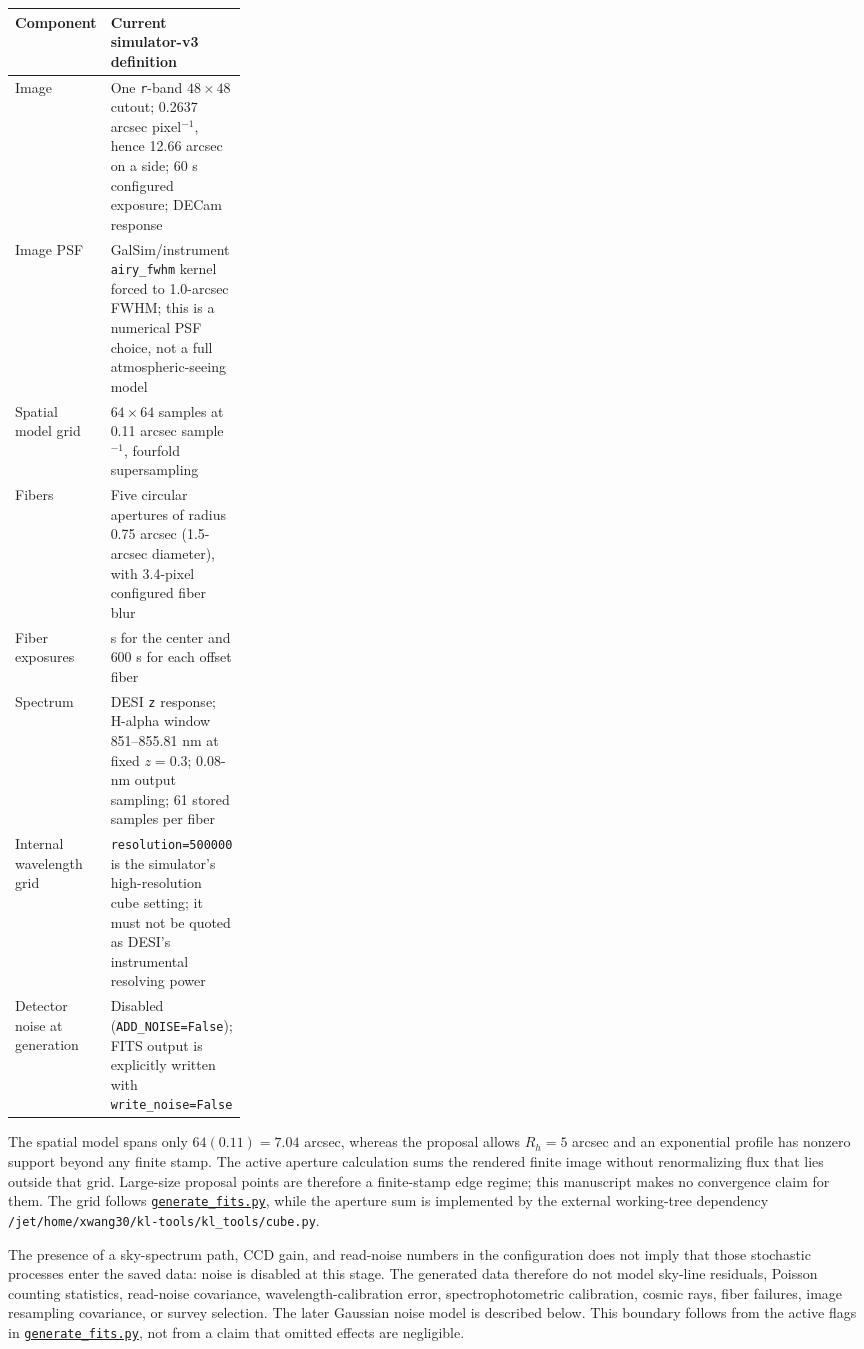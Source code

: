 \documentclass[11pt]{article}
\newcommand{\code}[1]{\nolinkurl{#1}}
\begin{document}
\begin{center}
\small
\begin{tabularx}{\linewidth}{@{}>{\RaggedRight\arraybackslash}p{0.27\linewidth} >{\RaggedRight\arraybackslash}X@{}}
\toprule
\textbf{Component} & \textbf{Current simulator-v3 definition} \\
\midrule
Image & One \code{r}-band \(48\times48\) cutout; 0.2637 arcsec pixel\(^{-1}\), hence 12.66 arcsec on a side; 60 s configured exposure; DECam response \\
Image PSF & GalSim/instrument \code{airy_fwhm} kernel forced to 1.0-arcsec FWHM; this is a numerical PSF choice, not a full atmospheric-seeing model \\
Spatial model grid & \(64\times64\) samples at 0.11 arcsec sample\(^{-1}\), fourfold supersampling \\
Fibers & Five circular apertures of radius 0.75 arcsec (1.5-arcsec diameter), with 3.4-pixel configured fiber blur \\
Fiber exposures & 180 s for the center and 600 s for each offset fiber \\
Spectrum & DESI \code{z} response; H-alpha window 851--855.81 nm at fixed \(z=0.3\); 0.08-nm output sampling; 61 stored samples per fiber \\
Internal wavelength grid & \code{resolution=500000} is the simulator's high-resolution cube setting; it must not be quoted as DESI's instrumental resolving power \\
Detector noise at generation & Disabled (\code{ADD_NOISE=False}); FITS output is explicitly written with \code{write_noise=False} \\
\bottomrule
\end{tabularx}
\end{center}

The spatial model spans only \(64(0.11)=7.04\) arcsec, whereas the proposal
allows \(R_h=5\) arcsec and an exponential profile has nonzero support
beyond any finite stamp. The active aperture calculation sums the rendered
finite image without renormalizing flux that lies outside that grid. Large-size
proposal points are therefore a finite-stamp edge regime; this manuscript makes
no convergence claim for them. The grid follows
\href{../data_generate/generate_fits.py}{\code{generate_fits.py}}, while the aperture
sum is implemented by the external working-tree dependency
\code{/jet/home/xwang30/kl-tools/kl_tools/cube.py}.

The presence of a sky-spectrum path, CCD gain, and read-noise numbers in the
configuration does not imply that those stochastic processes enter the saved
data: noise is disabled at this stage. The generated data therefore do not
model sky-line residuals, Poisson counting statistics, read-noise covariance,
wavelength-calibration error, spectrophotometric calibration, cosmic rays,
fiber failures, image resampling covariance, or survey selection. The later
Gaussian noise model is described below. This boundary follows from the active
flags in \href{../data_generate/generate_fits.py}{\code{generate_fits.py}}, not from a
claim that omitted effects are negligible.
\end{document}
